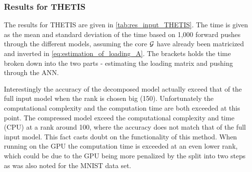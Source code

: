 \subsubsection{Results for THETIS}
The results for THETIS are given in \autoref{tab:res_input_THETIS}. The time is given as the mean and standard deviation of the time based on 1,000 forward pushes through the different models, assuming the core $\mathcal{G}$ have already been matricized and inverted in \eqref{eq:estimation_of_loading_A}. The brackets holds the time broken down into the two parts - estimating the loading matrix and pushing through the ANN.

Interestingly the accuracy of the decomposed model actually exceed that of the full input model when the rank is chosen big (150). Unfortunately the computational complexity and the computation time are both exceeded at this point. The compressed model exceed the computational complexity and time (CPU) at a rank around 100, where the accuracy does not match that of the full input model. This fact casts doubt on the functionality of this method. When running on the GPU the computation time is exceeded at an even lower rank, which could be due to the GPU being more penalized by the split into two steps as was also noted for the MNIST data set. 

